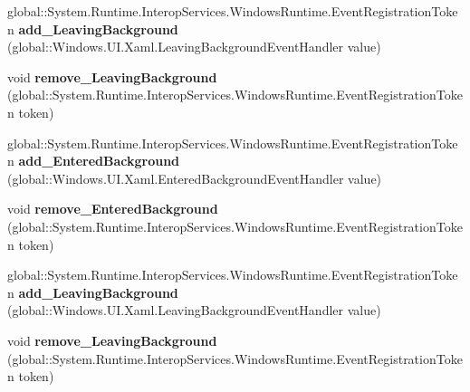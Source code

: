 \begin{DoxyCompactItemize}
global\+::\+System.\+Runtime.\+Interop\+Services.\+Windows\+Runtime.\+Event\+Registration\+Token {\bfseries add\+\_\+\+Leaving\+Background} (global\+::\+Windows.\+U\+I.\+Xaml.\+Leaving\+Background\+Event\+Handler value)
\item 
\mbox{\label{interface_windows_1_1_u_i_1_1_xaml_1_1_i_application2_a884312cad0a35622df0fc362403e4798}} 
void {\bfseries remove\+\_\+\+Leaving\+Background} (global\+::\+System.\+Runtime.\+Interop\+Services.\+Windows\+Runtime.\+Event\+Registration\+Token token)
\item 
\mbox{\label{interface_windows_1_1_u_i_1_1_xaml_1_1_i_application2_a0f800d5d5f7d3aef7f361e86183cd64b}} 
global\+::\+System.\+Runtime.\+Interop\+Services.\+Windows\+Runtime.\+Event\+Registration\+Token {\bfseries add\+\_\+\+Entered\+Background} (global\+::\+Windows.\+U\+I.\+Xaml.\+Entered\+Background\+Event\+Handler value)
\item 
\mbox{\label{interface_windows_1_1_u_i_1_1_xaml_1_1_i_application2_a7c5c73853965e2fd025af371c00a6c28}} 
void {\bfseries remove\+\_\+\+Entered\+Background} (global\+::\+System.\+Runtime.\+Interop\+Services.\+Windows\+Runtime.\+Event\+Registration\+Token token)
\item 
\mbox{\label{interface_windows_1_1_u_i_1_1_xaml_1_1_i_application2_ae4e829ae4af3431cd39dbff079622f52}} 
global\+::\+System.\+Runtime.\+Interop\+Services.\+Windows\+Runtime.\+Event\+Registration\+Token {\bfseries add\+\_\+\+Leaving\+Background} (global\+::\+Windows.\+U\+I.\+Xaml.\+Leaving\+Background\+Event\+Handler value)
\item 
\mbox{\label{interface_windows_1_1_u_i_1_1_xaml_1_1_i_application2_a884312cad0a35622df0fc362403e4798}} 
void {\bfseries remove\+\_\+\+Leaving\+Background} (global\+::\+System.\+Runtime.\+Interop\+Services.\+Windows\+Runtime.\+Event\+Registration\+Token token)
\item 
\mbox{\label{interface_windows_1_1_u_i_1_1_xaml_1_1_i_application2_a0f800d5d5f7d3aef7f361e86183cd64b}} 

\end{DoxyCompactItemize}
